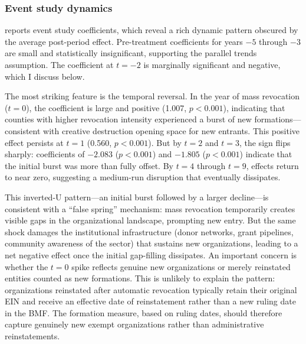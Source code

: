 \documentclass[12pt]{article}
\begin{document}


\subsubsection*{Event study dynamics}
 reports event study coefficients, which reveal a rich dynamic pattern obscured by the average post-period effect. Pre-treatment coefficients for years $-5$ through $-3$ are small and statistically insignificant, supporting the parallel trends assumption. The coefficient at $t = -2$ is marginally significant and negative, which I discuss below.

The most striking feature is the temporal reversal. In the year of mass revocation ($t = 0$), the coefficient is large and positive (1.007, $p < 0.001$), indicating that counties with higher revocation intensity experienced a burst of new formations---consistent with creative destruction opening space for new entrants. This positive effect persists at $t = 1$ (0.560, $p < 0.001$). But by $t = 2$ and $t = 3$, the sign flips sharply: coefficients of $-2.083$ ($p < 0.001$) and $-1.805$ ($p < 0.001$) indicate that the initial burst was more than fully offset. By $t = 4$ through $t = 9$, effects return to near zero, suggesting a medium-run disruption that eventually dissipates.



This inverted-U pattern---an initial burst followed by a larger decline---is consistent with a ``false spring'' mechanism: mass revocation temporarily creates visible gaps in the organizational landscape, prompting new entry. But the same shock damages the institutional infrastructure (donor networks, grant pipelines, community awareness of the sector) that sustains new organizations, leading to a net negative effect once the initial gap-filling dissipates. An important concern is whether the $t = 0$ spike reflects genuine new organizations or merely reinstated entities counted as new formations. This is unlikely to explain the pattern: organizations reinstated after automatic revocation typically retain their original EIN and receive an effective date of reinstatement rather than a new ruling date in the BMF. The formation measure, based on ruling dates, should therefore capture genuinely new exempt organizations rather than administrative reinstatements.
\end{document}
